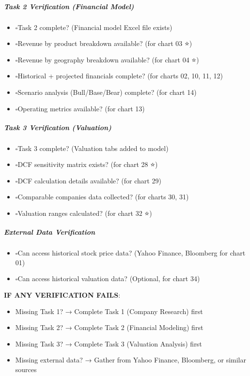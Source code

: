\documentclass[11pt]{article}
\newcommand{\UncheckedBox}{$\square$}
\begin{document}
\subparagraph{Task 2 Verification (Financial Model)}\mbox{}\par
\begin{itemize}[leftmargin=*,itemsep=2pt,topsep=2pt]
\item {} \UncheckedBox Task 2 complete? (Financial model Excel file exists)
\item {} \UncheckedBox Revenue by product breakdown available? (for chart 03 ⭐)
\item {} \UncheckedBox Revenue by geography breakdown available? (for chart 04 ⭐)
\item {} \UncheckedBox Historical + projected financials complete? (for charts 02, 10, 11, 12)
\item {} \UncheckedBox Scenario analysis (Bull/Base/Bear) complete? (for chart 14)
\item {} \UncheckedBox Operating metrics available? (for chart 13)
\end{itemize}

\subparagraph{Task 3 Verification (Valuation)}\mbox{}\par
\begin{itemize}[leftmargin=*,itemsep=2pt,topsep=2pt]
\item {} \UncheckedBox Task 3 complete? (Valuation tabs added to model)
\item {} \UncheckedBox DCF sensitivity matrix exists? (for chart 28 ⭐)
\item {} \UncheckedBox DCF calculation details available? (for chart 29)
\item {} \UncheckedBox Comparable companies data collected? (for charts 30, 31)
\item {} \UncheckedBox Valuation ranges calculated? (for chart 32 ⭐)
\end{itemize}

\subparagraph{External Data Verification}\mbox{}\par
\begin{itemize}[leftmargin=*,itemsep=2pt,topsep=2pt]
\item {} \UncheckedBox Can access historical stock price data? (Yahoo Finance, Bloomberg for chart 01)
\item {} \UncheckedBox Can access historical valuation data? (Optional, for chart 34)
\end{itemize}

\textbf{IF ANY VERIFICATION FAILS}:

\begin{itemize}[leftmargin=*,itemsep=2pt,topsep=2pt]
\item {} Missing Task 1? → Complete Task 1 (Company Research) first
\item {} Missing Task 2? → Complete Task 2 (Financial Modeling) first
\item {} Missing Task 3? → Complete Task 3 (Valuation Analysis) first
\item {} Missing external data? → Gather from Yahoo Finance, Bloomberg, or similar sources
\end{itemize}
\end{document}
